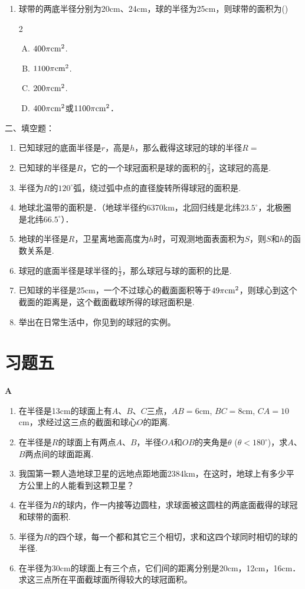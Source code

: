 \begin{enumerate}
\item 球带的两底半径分别为20cm、24cm，球的半径为25cm，则球带的面积为\hfill (\qquad )
\begin{multicols}{2}
\begin{enumerate}[(A)]
\item $400\pi {\rm cm^2}$.
\item $1100\pi {\rm cm^2}$.
\item $200\pi {\rm cm^2}$.
\item $400\pi {\rm cm^2}$或$1100\pi {\rm cm^2}$．
\end{enumerate}    
\end{multicols}
\end{enumerate}

二、填空题：
\begin{enumerate}
\item 已知球冠的底面半径是$r$，高是$h$，那么截得这球冠的球的半径$R=$\blank
\item 已知球的半径是$R$，它的一个球冠面积是球的面积的$\frac{2}{3}$，这球冠的高是\blank.
\item 半径为$R$的$120^{\circ}$弧，绕过弧中点的直径旋转所得球冠的面积是\blank.
\item 地球北温带的面积是\blank．（地球半径约6370km，北回归线是北纬$23.5^{\circ}$，北极圈
是北纬$66.5^{\circ}$）．
\item 地球的半径是$R$，卫星离地面高度为$h$时，可观测地面表面积为$S$，则$S$和$h$的函数关系是\blank.
\item 球冠的底面半径是球半径的$\frac{1}{2}$，那么球冠与球的面积的比是\blank.
\item 已知球的半径是25cm，一个不过球心的截面面积等于$49\pi {\rm cm^2}$，则球心到这个截面的距离是\blank，这个截面截球所得的球冠面积是\blank.
\item 举出在日常生活中，你见到的球冠的实例。
\end{enumerate}

\section*{习题五}
\begin{center}
    \bfseries A
\end{center}

\begin{enumerate}
\item 在半径是13cm的球面上有$A$、$B$、$C$三点，$AB=6$cm, $BC=8$cm, $CA=10$cm，求经过这三点的截面和球心$O$的距离.
\item 在半径是$R$的球面上有两点$A$、$B$，半径$OA$和$OB$的夹角是$\theta$ ($\theta<180^{\circ}$)，求$A$、$B$两点间的球面距离.
\item 我国第一颗人造地球卫星的远地点距地面2384km，在这时，地球上有多少平方公里上的人能看到这颗卫星？
\item 在半径为$R$的球内，作一内接等边圆柱，求球面被这圆柱的两底面截得的球冠和球带的面积.
\item 半径为$R$的四个球，每一个都和其它三个相切，求和这四个球同时相切的球的半径.
\item 在半径为30cm的球面上有三个点，它们间的距离分别是20cm，12cm，16cm．求这三点所在平面截球面所得较大的球冠面积。
\end{enumerate}

